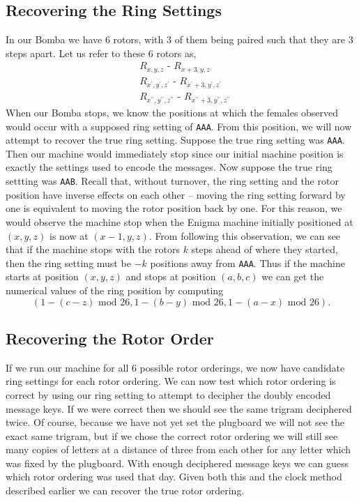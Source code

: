 \subsection{Recovering the Ring Settings}
In our Bomba we have 6 rotors, with 3 of them being paired such that
they are 3 steps apart. Let us refer to these 6 rotors as,
\begin{align*}
  & R_{x,y,z} \texttt{ - } R_{x+3,y,z}
  \\
  & R_{x^\prime,y^\prime,z^\prime} \texttt{ - }
  R_{x^\prime+3,y^\prime,z^\prime}
  \\
  & R_{x^{\prime\prime},y^{\prime\prime},z^{\prime\prime}} \texttt{ -
  } R_{x^{\prime\prime}+3,y^{\prime\prime},z^{\prime\prime}}
\end{align*}
When our Bomba stops, we know the positions at which the females
observed would occur with a supposed ring setting of \texttt{AAA}.
From this position, we will now attempt to recover the true ring
setting. Suppose the true ring setting was \texttt{AAA}. Then our
machine would immediately stop since our initial machine position is
exactly the settings used to encode the messages. Now suppose the
true ring settting was \texttt{AAB}. Recall that, without turnover,
the ring setting and the rotor position have inverse effects on each
other -- moving the ring setting forward by one is equivalent to
moving the rotor position back by one. For this reason, we would
observe the machine stop when the Enigma machine initially positioned
at $(x,y,z)$ is now at $(x-1,y,z)$. From following this observation,
we can see that if the machine stops with the rotors $k$ steps ahead
of where they started, then the ring setting must be $-k$ positions
away from \texttt{AAA}. Thus if the machine starts at position
$(x,y,z)$ and stops at position $(a,b,c)$ we can get the numerical
values of the ring position by computing
\[
  (1 - (c- z)\text{ mod }26, 1 - (b- y)\text{ mod }26, 1 - (a-
  x)\text{ mod }26).
\]

\subsection{Recovering the Rotor Order}
If we run our machine for all $6$ possible rotor orderings, we now
have candidate ring settings for each rotor ordering. We can now test
which rotor ordering is correct by using our ring setting to attempt
to decipher the doubly encoded message keys. If we were correct then
we should see the same trigram deciphered twice. Of course, because
we have not yet set the plugboard we will not see the exact same
trigram, but if we chose the correct rotor ordering we will still see
many copies of letters at a distance of three from each other for any
letter which was fixed by the plugboard. With enough deciphered
message keys we can guess which rotor ordering was used that day.
Given both this and the clock method described earlier we can recover
the true rotor ordering.

